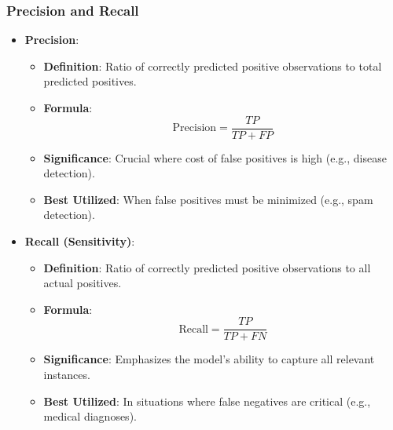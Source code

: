 \documentclass[aspectratio=169]{beamer}
\begin{document}
\begin{frame}[fragile]
    \frametitle{Precision and Recall}
    \begin{itemize}
        \item \textbf{Precision}:
        \begin{itemize}
            \item \textbf{Definition}: Ratio of correctly predicted positive observations to total predicted positives.
            \item \textbf{Formula}:
            \begin{equation}
            \text{Precision} = \frac{TP}{TP + FP}
            \end{equation}
            \item \textbf{Significance}: Crucial where cost of false positives is high (e.g., disease detection).
            \item \textbf{Best Utilized}: When false positives must be minimized (e.g., spam detection).
        \end{itemize}
        \item \textbf{Recall (Sensitivity)}:
        \begin{itemize}
            \item \textbf{Definition}: Ratio of correctly predicted positive observations to all actual positives.
            \item \textbf{Formula}:
            \begin{equation}
            \text{Recall} = \frac{TP}{TP + FN}
            \end{equation}
            \item \textbf{Significance}: Emphasizes the model's ability to capture all relevant instances.
            \item \textbf{Best Utilized}: In situations where false negatives are critical (e.g., medical diagnoses).
        \end{itemize}
    \end{itemize}
\end{frame}
\end{document}

